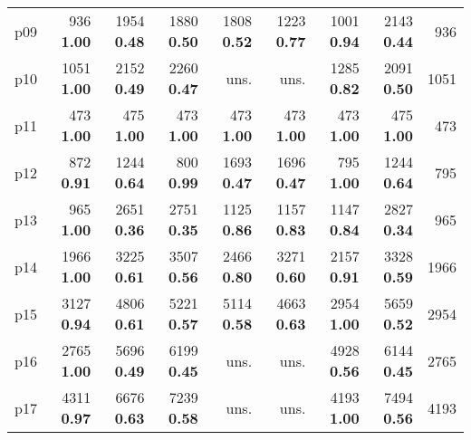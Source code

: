 \begin{tabular}{|l|rrrrrrr|r|}
p09 & {\footnotesize 936} \textbf{1.00} & {\footnotesize 1954} \textbf{0.48} & {\footnotesize 1880} \textbf{0.50} & {\footnotesize 1808} \textbf{0.52} & {\footnotesize 1223} \textbf{0.77} & {\footnotesize 1001} \textbf{0.94} & {\footnotesize 2143} \textbf{0.44} & 936\\
p10 & {\footnotesize 1051} \textbf{1.00} & {\footnotesize 2152} \textbf{0.49} & {\footnotesize 2260} \textbf{0.47} & uns. & uns. & {\footnotesize 1285} \textbf{0.82} & {\footnotesize 2091} \textbf{0.50} & 1051\\
p11 & {\footnotesize 473} \textbf{1.00} & {\footnotesize 475} \textbf{1.00} & {\footnotesize 473} \textbf{1.00} & {\footnotesize 473} \textbf{1.00} & {\footnotesize 473} \textbf{1.00} & {\footnotesize 473} \textbf{1.00} & {\footnotesize 475} \textbf{1.00} & 473\\
p12 & {\footnotesize 872} \textbf{0.91} & {\footnotesize 1244} \textbf{0.64} & {\footnotesize 800} \textbf{0.99} & {\footnotesize 1693} \textbf{0.47} & {\footnotesize 1696} \textbf{0.47} & {\footnotesize 795} \textbf{1.00} & {\footnotesize 1244} \textbf{0.64} & 795\\
p13 & {\footnotesize 965} \textbf{1.00} & {\footnotesize 2651} \textbf{0.36} & {\footnotesize 2751} \textbf{0.35} & {\footnotesize 1125} \textbf{0.86} & {\footnotesize 1157} \textbf{0.83} & {\footnotesize 1147} \textbf{0.84} & {\footnotesize 2827} \textbf{0.34} & 965\\
p14 & {\footnotesize 1966} \textbf{1.00} & {\footnotesize 3225} \textbf{0.61} & {\footnotesize 3507} \textbf{0.56} & {\footnotesize 2466} \textbf{0.80} & {\footnotesize 3271} \textbf{0.60} & {\footnotesize 2157} \textbf{0.91} & {\footnotesize 3328} \textbf{0.59} & 1966\\
p15 & {\footnotesize 3127} \textbf{0.94} & {\footnotesize 4806} \textbf{0.61} & {\footnotesize 5221} \textbf{0.57} & {\footnotesize 5114} \textbf{0.58} & {\footnotesize 4663} \textbf{0.63} & {\footnotesize 2954} \textbf{1.00} & {\footnotesize 5659} \textbf{0.52} & 2954\\
p16 & {\footnotesize 2765} \textbf{1.00} & {\footnotesize 5696} \textbf{0.49} & {\footnotesize 6199} \textbf{0.45} & uns. & uns. & {\footnotesize 4928} \textbf{0.56} & {\footnotesize 6144} \textbf{0.45} & 2765\\
p17 & {\footnotesize 4311} \textbf{0.97} & {\footnotesize 6676} \textbf{0.63} & {\footnotesize 7239} \textbf{0.58} & uns. & uns. & {\footnotesize 4193} \textbf{1.00} & {\footnotesize 7494} \textbf{0.56} & 4193\\

\end{tabular}
